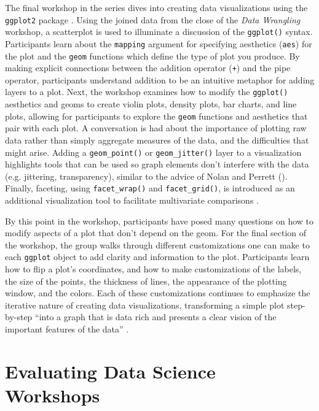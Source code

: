 \documentclass[12pt]{article}
\begin{document}
\noindent The final workshop in the series dives into creating data visualizations
using the \texttt{ggplot2} package \citep{ggplot}. Using the joined data from
the close of the \emph{Data Wrangling} workshop, a scatterplot is used to
illuminate a discussion of the \texttt{ggplot()} syntax. Participants learn
about the \texttt{mapping} argument
for specifying aesthetics (\texttt{aes}) for the plot and the \texttt{geom}
functions which define the type of plot you produce. By making
explicit connections between the addition operator (\texttt{+}) and the pipe
operator, participants understand addition to be an intuitive metaphor for
adding layers to a plot. Next, the workshop examines how to modify the
\texttt{ggplot()} aesthetics and geoms to create violin plots, density plots, 
bar charts, and line plots, allowing for participants to explore the 
\texttt{geom} functions and aesthetics that pair with each plot. A conversation
is had about the importance of plotting raw data rather than simply aggregate
measures of the data, and the difficulties that might arise. Adding a
\texttt{geom\_point()} or \texttt{geom\_jitter()} layer to a visualization
highlights tools that can be used so graph elements don't interfere with the
data (e.g. jittering, transparency), similar to the advice of Nolan and Perrett
(\citeyear{nolan-viz}). Finally, faceting, using \texttt{facet\_wrap()} and
\texttt{facet\_grid()}, is introduced as an additional visualization tool to
facilitate multivariate comparisons \citep[p.\ 261]{nolan-viz}. 

\quad By this point in the workshop, participants have posed many questions on
how to modify aspects of a plot that don't depend on the geom. For the final 
section of the workshop, the group walks through different customizations one 
can make to each \texttt{ggplot} object to add clarity and information to the 
plot. Participants learn how to flip a plot's coordinates, and how to make
customizations of the labels, the size of the points, the thickness of
lines, the appearance of the plotting window, and the colors. Each of
these customizations continues to emphasize the iterative nature 
of creating data visualizations, transforming a simple plot step-by-step ``into
a graph that is data rich and presents a clear vision of the important features
of the data'' \citep[p.\ 262]{nolan-viz}.

\section{Evaluating Data Science Workshops}
\label{sec:implement}
\end{document}
